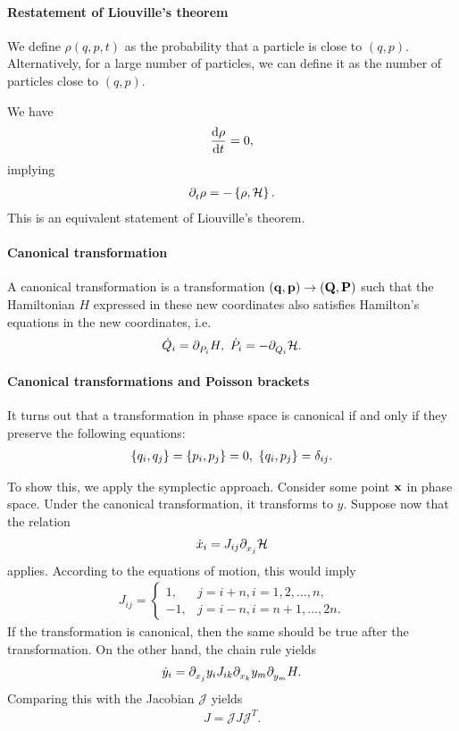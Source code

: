 \paragraph{Restatement of Liouville's theorem}
We define $\rho(q, p, t)$ as the probability that a particle is close to $(q, p)$. Alternatively, for a large number of particles, we can define it as the number of particles close to $(q, p)$.

We have
\begin{align*}
	\dv{\rho}{t} = 0,
\end{align*}
implying
\begin{align*}
	\partial^{}_{t}\rho = -\left\{\rho, \mathcal{H}\right\}.
\end{align*}
This is an equivalent statement of Liouville's theorem.

\paragraph{Canonical transformation}
A canonical transformation is a transformation $(\vb{q}, \vb{p})\to (\vb{Q}, \vb{P})$ such that the Hamiltonian $H$ expressed in these new coordinates also satisfies Hamilton's equations in the new coordinates, i.e.
\begin{align*}
	\dot{Q}_{i} = \partial^{}_{P_{i}}H,\ \dot{P}_{i} = -\partial^{}_{Q_{i}}\mathcal{H}.
\end{align*}

\paragraph{Canonical transformations and Poisson brackets}
It turns out that a transformation in phase space is canonical if and only if they preserve the following equations:
\begin{align*}
	\left\{q_{i}, q_{j}\right\} = \left\{p_{i}, p_{j}\right\} = 0,\ \left\{q_{i}, p_{j}\right\} = \delta_{ij}.
\end{align*}

To show this, we apply the symplectic approach. Consider some point $\vb{x}$ in phase space. Under the canonical transformation, it transforms to $y$. Suppose now that the relation
\begin{align*}
	\dot{x}_{i} = J_{ij}\partial^{}_{x_{j}}\mathcal{H}
\end{align*}
applies. According to the equations of motion, this would imply
\begin{align*}
	J_{ij} = 
	\begin{cases}
		 1, &j = i + n, i = 1, 2, \dots, n, \\
		-1, &j = i - n, i = n + 1, \dots, 2n.
	\end{cases}
\end{align*}
If the transformation is canonical, then the same should be true after the transformation. On the other hand, the chain rule yields
\begin{align*}
	\dot{y}_{i} = \partial^{}_{x_{j}}y_{i}J_{ik}\partial^{}_{x_{k}}y_{m}\partial^{}_{y_{m}}H.
\end{align*}
Comparing this with the Jacobian $\mathcal{J}$ yields
\begin{align*}
	J = \mathcal{J}J\mathcal{J}^{T}.
\end{align*}

